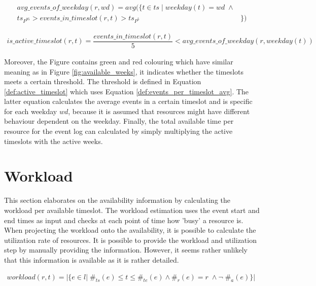 \begin{equation}\label{def:events_per_timeslot_avg}
  \begin{split}
    avg\_events\_of\_weekday(r, wd) = avg(\{t \in ts \; | \; weekday(t) = wd \; \wedge & \\ 
    ts_{P^{95}} > events\_in\_timeslot(r, t) > ts_{P^{5}} & \})
  \end{split}
\end{equation}

\begin{equation}\label{def:active_timeslot}
  \begin{array}{l}
    is\_active\_timeslot(r, t) = \dfrac{events\_in\_timeslot(r,t)}{5} < avg\_events\_of\_weekday(r, weekday(t))
  \end{array}
\end{equation}

Moreover, the Figure contains green and red colouring which have similar meaning as in Figure \ref{fig:available_weeks}, it indicates whether the timeslots meets a certain threshold. The threshold is defined in Equation \ref{def:active_timeslot} which uses Equation \ref{def:events_per_timeslot_avg}. The latter equation calculates the average events in a certain timeslot and is specific for each weekday $wd$, because it is assumed that resources might have different behaviour dependent on the weekday. Finally, the total available time per resource for the event log can calculated by simply multiplying the active timeslots with the active weeks. 

\section{Workload}
This section elaborates on the availability information by calculating the workload per available timeslot. The workload estimation uses the event start and end times as input and checks at each point of time how 'busy' a resource is. When projecting the workload onto the availability, it is possible to calculate the utilization rate of resources. It is possible to provide the workload and utilization step by manually providing the information. However, it seems rather unlikely that this information is available as it is rather detailed.  

\begin{equation}\label{def:workload_time}
  \begin{array}{l}
    workload(r,t) =  
    | \{e \in l | \; \#_{ts}(e)  \leq t \leq \#_{te}(e) \wedge \#_r(e)=r \; \wedge \neg \; \#_{a}(e)\}| \; 
  \end{array}
\end{equation}

